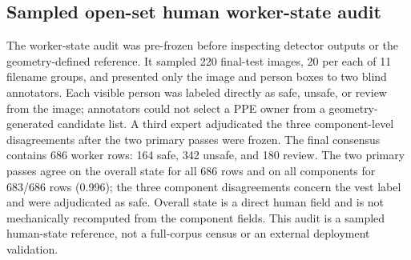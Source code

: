 \documentclass[iicol,pdflatex,sn-mathphys-num]{sn-jnl}
\begin{document}
\begin{table}[t]
\caption{Open-candidate, source-stratified random human ownership audit. The 66 pre-frozen images contain 334 PPE boxes from all 11 filename groups. Conditional exact scoring excludes 13 three-pass \texttt{AMBIGUOUS} rows, leaving 321 determinate owner rows. ``All-row lower'' instead counts each ambiguous row as a non-match; it is conservative sensitivity, not a known-error estimate. Exact requires equality of the predicted and blind-majority human owner sets. Brackets are descriptive filename-group resampling intervals, not cluster-valid confidence intervals.}
\label{tab:randomaudit}
\centering
\scriptsize
\setlength{\tabcolsep}{4pt}
\end{table}

\subsection{Sampled open-set human worker-state audit}\label{sec:humanstateaudit}
The worker-state audit was pre-frozen before inspecting detector outputs or the geometry-defined reference. It sampled 220 final-test images, 20 per each of 11 filename groups, and presented only the image and person boxes to two blind annotators. Each visible person was labeled directly as safe, unsafe, or review from the image; annotators could not select a PPE owner from a geometry-generated candidate list. A third expert adjudicated the three component-level disagreements after the two primary passes were frozen. The final consensus contains 686 worker rows: 164 safe, 342 unsafe, and 180 review. The two primary passes agree on the overall state for all 686 rows and on all components for 683/686 rows (0.996); the three component disagreements concern the vest label and were adjudicated as safe. Overall state is a direct human field and is not mechanically recomputed from the component fields. This audit is a sampled human-state reference, not a full-corpus census or an external deployment validation.
\end{document}
